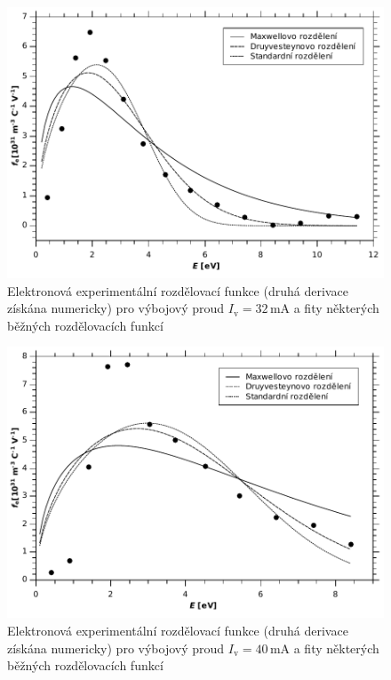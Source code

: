 \documentclass[12pt]{article}
\begin{document}
\begin{figure}[htbp]
\begin{center}
\includegraphics[width=12cm]{iv32dist.pdf}
\caption{Elektronová experimentální rozdělovací funkce (druhá derivace získána numericky) pro výbojový proud $I_\mathrm{v} = 32$\,mA a fity některých běžných rozdělovacích funkcí}
\label{iv32}
\end{center}
\end{figure}

\begin{figure}[htbp]
\begin{center}
\includegraphics[width=12cm]{Iv40dist.pdf}
\caption{Elektronová experimentální rozdělovací funkce (druhá derivace získána numericky) pro výbojový proud $I_\mathrm{v} = 40$\,mA a fity některých běžných rozdělovacích funkcí}
\label{iv40}
\end{center}
\end{figure}
\end{document}
